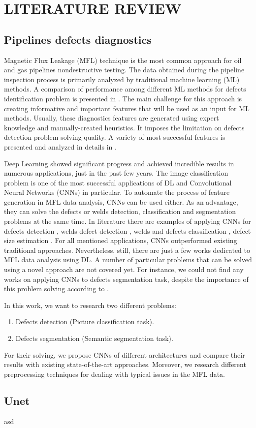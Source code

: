 \section{LITERATURE REVIEW}
\label{LITERATURE REVIEW}

\subsection{Pipelines defects diagnostics}

Magnetic Flux Leakage (MFL) technique is the most common approach for oil and gas pipelines nondestructive testing.
The data obtained during the pipeline inspection process is primarily analyzed by traditional machine learning (ML) methods.
A comparison of performance among different ML methods for defects identification problem is presented in \cite{Khodayari-Rostamabad2009}.
The main challenge for this approach is creating informative and important features that will be used as an input for ML methods.
Usually, these diagnostics features are generated using expert knowledge and manually-created heuristics.
It imposes the limitation on defects detection problem solving quality.
A variety of most successful features is presented and analyzed in details in \cite{Slesarev2017}.

Deep Learning showed significant progress and achieved incredible results in numerous applications, just in the past few years.
The image classification problem is one of the most successful applications of DL and Convolutional Neural Networks (CNNs) in particular.
To automate the process of feature generation in MFL data analysis, CNNs can be used either.
As an advantage, they can solve the defects or welds detection, classification and segmentation problems at the same time.
In literature there are examples of applying CNNs for defects detection \cite{Feng2017}, welds defect detection \cite{2020a}, welds and defects classification \cite{Yang2020}, defect size estimation \cite{Lu2019}.
For all mentioned applications, CNNs outperformed existing traditional approaches.
Nevertheless, still, there are just a few works dedicated to MFL data analysis using DL.
A number of particular problems that can be solved using a novel approach are not covered yet.
For instance, we could not find any works on applying CNNs to defects segmentation task, despite the importance of this problem solving according to \cite{Feng2017}.

In this work, we want to research two different problems:
\begin{enumerate}
	\item Defects detection (Picture classification task).
	\item Defects segmentation (Semantic segmentation task).
\end{enumerate}

For their solving, we propose CNNs of different architectures and compare their results with existing state-of-the-art approaches.
Moreover, we research different preprocessing techniques for dealing with typical issues in the MFL data.

\subsection{Unet}

asd \cite{Ronneberger2015a}
